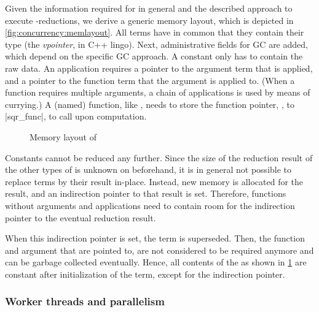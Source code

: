 \label{s:concurrency:memlayout}

Given the information required for \lterms* in general and the described approach to execute \fxbeta-reductions, we derive a generic memory layout, which is depicted in \vref{fig:concurrency:memlayout}.
All terms have in common that they contain their type (the \emph{vpointer}, in C++ lingo).
Next, administrative fields for \ac{GC} are added, which depend on the specific \ac{GC} approach.
A constant only has to contain the raw data.
An application requires a pointer to the argument term that is applied, and a pointer to the function term that the argument is applied to.
(When a function requires multiple arguments, a chain of applications is used by means of currying.)
A (named) function, like , needs to store the function pointer, \eg, to \lsticode|sqr_func|, to call upon computation.

\begin{figure}%
%
\caption{Memory layout of \lterms}%
\label{fig:concurrency:memlayout}%
\end{figure}

Constants cannot be reduced any further.
Since the size of the reduction result of the other types of \lterms is unknown on beforehand, it is in general not possible to replace terms by their result in-place.
Instead, new memory is allocated for the result, and an indirection pointer to that result is set.
Therefore, functions without arguments and applications need to contain room for the indirection pointer to the eventual reduction result.

When this indirection pointer is set, the term is superseded.
Then, the function and argument that are pointed to, are not considered to be required anymore and can be garbage collected eventually.
Hence, all contents of the \lterms as shown in \cref{fig:concurrency:memlayout} are constant after initialization of the term, except for the indirection pointer.

\subsubsection{Worker threads and parallelism}

